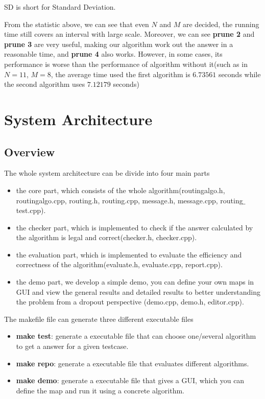\documentclass[twocolumn]{article}
\begin{document}
SD is short for Standard Deviation.

From the statistic above, we can see that even $N$ and $M$ are decided, the running time still covers an interval with large scale. Moreover, we can see \textbf{prune 2} and \textbf{prune 3} are very useful, making our algorithm work out the answer in a reasonable time, and \textbf{prune 4} also works. However, in some cases, its performance is worse than the performance of algorithm without it(such as in $N = 11$, $M = 8$, the average time used the first algorithm is $6.73561$ seconds while the second algorithm uses $7.12179$ seconds)


\section{System Architecture}

\subsection{Overview}

The whole system architecture can be divide into four main parts

\begin{itemize}
    \item the core part, which consists of the whole algorithm(routingalgo.h, routingalgo.cpp, routing.h, routing.cpp, message.h, message.cpp, routing$\_$test.cpp).
    \item the checker part, which is implemented to check if the answer calculated by the algorithm is legal and correct(checker.h, checker.cpp).
    \item the evaluation part, which is implemented to evaluate the efficiency and correctness of the algorithm(evaluate.h, evaluate.cpp, report.cpp).
    \item the demo part, we develop a simple demo, you can define your own maps in GUI and view the general results and detailed results to better understanding the problem from a dropout perspective (demo.cpp, demo.h, editor.cpp).
\end{itemize}

The makefile file can generate three different executable files

\begin{itemize}
    \item \textbf{make test}: generate a executable file that can choose one/several algorithm to get a answer for a given testcase.
    \item \textbf{make repo}: generate a executable file that evaluates different algorithms.
    \item \textbf{make demo}: generate a executable file that gives a GUI, which you can define the map and run it using a concrete algorithm.
\end{itemize}
\end{document}
